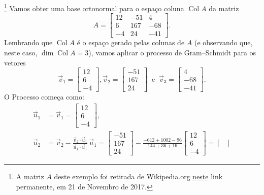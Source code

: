 \begin{ex}\footnote{A matriz $A$ deste exemplo foi retirada de Wikipedia.org \href{https://en.wikipedia.org/w/index.php?title=QR_decomposition&oldid=810854220}{neste} link permanente, em 21 de Novembro de 2017.}
Vamos obter uma base ortonormal para o espaço coluna $\operatorname{Col} A$ da matriz
\begin{equation}
A =
\begin{bmatrix}
12 & -51 & 4 \\
6 & 167 & -68 \\
-4 & 24 & -41
\end{bmatrix}.
\end{equation} Lembrando que $\operatorname{Col} A$ é o espaço gerado pelas colunas de $A$ (e observando que, neste caso, $\dim \operatorname{Col} A = 3$), vamos aplicar o processo de Gram--Schmidt para os vetores
\begin{equation}
\vec{v}_1 =
\begin{bmatrix}
12 \\
6 \\
-4
\end{bmatrix},
\vec{v}_2 =
\begin{bmatrix}
 -51  \\
 167  \\
 24
\end{bmatrix} \ \text{ e } \ \vec{v}_3 =
\begin{bmatrix}
  4 \\
 -68 \\
 -41
\end{bmatrix}.
\end{equation} O Processo começa como:
\begin{align*}
\vec{u}_1 & = \vec{v}_1 =
\begin{bmatrix}
12 \\
6 \\
-4
\end{bmatrix}, \\
\vec{u}_2 &  = \vec{v}_2 - \frac{\vec{v}_2 \cdot \vec{u}_1}{\vec{u}_1 \cdot \vec{u}_1} \, \vec{u}_1 =
\begin{bmatrix}
 -51  \\
 167  \\
 24
\end{bmatrix} - \frac{-612 +1002 - 96}{144 + 36 + 16}
\begin{bmatrix}
12 \\
6 \\
-4
\end{bmatrix} =
\begin{bmatrix}

\end{bmatrix}
\end{align*}
\end{ex}
